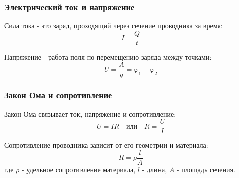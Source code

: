\documentclass{article}
\begin{document}
\subsubsection*{Электрический ток и напряжение}
Сила тока - это заряд, проходящий через сечение проводника за время:
\[I = \frac{Q}{t}\]

Напряжение - работа поля по перемещению заряда между точками:
\[U = \frac{A}{q} = \varphi_1 - \varphi_2\]

\subsubsection*{Закон Ома и сопротивление}
Закон Ома связывает ток, напряжение и сопротивление:
\[U = IR \quad \text{или} \quad R = \frac{U}{I}\]

Сопротивление проводника зависит от его геометрии и материала:
\[R = \rho\frac{l}{A}\]
где $\rho$ - удельное сопротивление материала, $l$ - длина, $A$ - площадь сечения.
\end{document}

